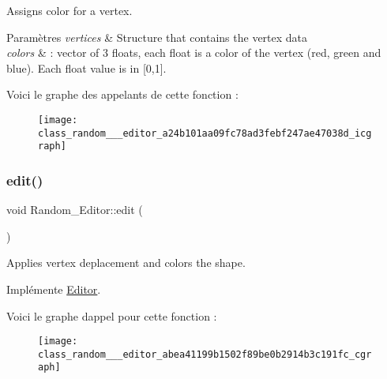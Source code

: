 Assigns color for a vertex. 


\begin{DoxyParams}{Paramètres}
{\em vertices} & Structure that contains the vertex data \\
\hline
{\em colors} & \+: vector of 3 floats, each float is a color of the vertex (red, green and blue). Each float value is in \mbox{[}0,1\mbox{]}. \\
\hline
\end{DoxyParams}
Voici le graphe des appelants de cette fonction \+:
\nopagebreak
\begin{figure}[H]
\begin{center}
\leavevmode
\texttt{[image: class\_random\_\_\_editor\_a24b101aa09fc78ad3febf247ae47038d\_icgraph]}
\end{center}
\end{figure}
\mbox{\label{class_random___editor_abea41199b1502f89be0b2914b3c191fc}} 
\subsubsection{\texorpdfstring{edit()}{edit()}}
{\footnotesize\ttfamily void Random\+\_\+\+Editor\+::edit (\begin{DoxyParamCaption}{ }\end{DoxyParamCaption})\hspace{0.3cm}{\ttfamily [virtual]}}



Applies vertex deplacement and colors the shape. 



Implémente \hyperlink{class_editor_abca97ba11536c494a0c26bac77917792}{Editor}.

Voici le graphe d\textquotesingle{}appel pour cette fonction \+:
\nopagebreak
\begin{figure}[H]
\begin{center}
\leavevmode
\texttt{[image: class\_random\_\_\_editor\_abea41199b1502f89be0b2914b3c191fc\_cgraph]}
\end{center}
\end{figure}
\mbox{\label{class_random___editor_aa194991b2926aeab96ad5470f549f087}} 
